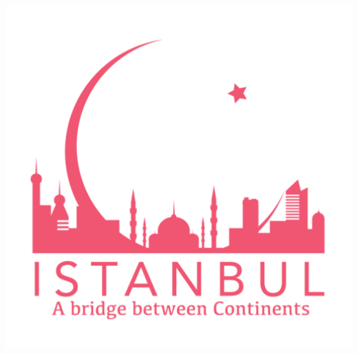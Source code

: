 \documentclass[a0,portrait]{a0poster}
\begin{document}
\begin{multicols}{2}
\begin{center}\vspace{1cm}
\includegraphics[width=30cm,height=25cm]{Quinonez_Julian_Istanbul_Logo.png}
\end{center}\vspace{1cm}



\end{multicols}
\end{document}
